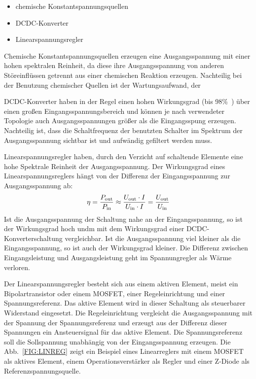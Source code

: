 \begin{itemize}
  \item chemische Konstantspannungsquellen
  \item DCDC-Konverter
  \item Linearspannungsregler
\end{itemize}

Chemische Konstantspannungsquellen erzeugen eine Ausgangsspannung mit einer 
hohen spektralen Reinheit, da diese ihre Ausgangsspannung von anderen 
Störeinflüssen getrennt aus einer chemischen Reaktion erzeugen.
Nachteilig bei der Benutzung chemischer Quellen ist der Wartungsaufwand, der

DCDC-Konverter haben in der Regel einen hohen Wirkungsgrad (bis 
98\%~\cite[Industr.com]{Webp:DCDC98}) über einen großen
Eingangsspannungsbereich und können je nach verwendeter Topologie auch 
Ausgangsspannungen größer als die Eingangsspung erzeugen.
Nachteilig ist, dass die Schaltfrequenz der benutzten Schalter im Spektrum der
Ausgangsspannung sichtbar ist und aufwändig gefiltert werden muss.

Linearspannungsregler haben, durch den Verzicht auf schaltende Elemente eine
hohe Spektrale Reinheit der Ausgangsspannung.
Der Wirkungsgrad eines Linearspannungsreglers hängt von der Differenz der 
Eingangsspannung zur Ausgangsspannung ab:
\[\eta = \frac{P_{\rm out}}{P_{\rm in}} \approx \frac{U_{\rm out} 
\cdot I}{U_{\rm in} \cdot I} = \frac{U_{\rm out}}{U_{\rm in}}\]
Ist die Ausgangsspannung der Schaltung nahe an der Eingangsspannung,
so ist der Wirkungsgrad hoch undm mit dem Wirkungsgrad einer 
DCDC-Konverterschaltung vergleichbar. Ist die Ausgangsspannung viel kleiner als die
Eingangsspannung, so ist auch der Wirkungsgrad kleiner.
Die Differenz zwischen Eingangsleistung und Ausgangsleistung geht im 
Spannungregler als Wärme verloren. 

Der Linearspannungsregler besteht sich aus einem aktiven Element, meist ein 
Bipolartransistor oder einem MOSFET, einer Regeleinrichtung und einer 
Spannungsreferenz.
Das aktive Element wird in dieser Schaltung als steuerbarer Widerstand 
eingesetzt.
Die Regeleinrichtung vergleicht die Ausgangsspannung mit der Spannung der 
Spannungsreferenz und erzeugt aus der Differenz dieser Spannungen ein 
Ansteuersignal für das aktive Element.
Die Spannungsreferenz soll die Sollspannung unabhängig von der Eingangsspannung
erzeugen.
Die Abb.~\ref{FIG:LINREG} zeigt ein Beispiel eines Linearreglers mit einem
MOSFET als aktives Element, einem Operationsverstärker als Regler und einer
Z-Diode als Referenzspannungsquelle.

